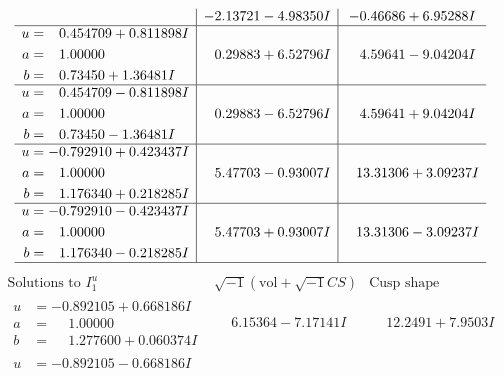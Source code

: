 \documentclass[1p]{elsarticle_modified}
\theoremstyle{definition}
\newcommand{\I}{\sqrt{-1}}
\begin{document}
$$\begin{array}{c|c|c}
 & -2.13721 - 4.98350 I & -0.46686 + 6.95288 I \\ \hline\begin{aligned}
u &= \phantom{-}0.454709 + 0.811898 I \\
a &= \phantom{-}1.00000\phantom{ +0.000000I} \\
b &= \phantom{-}0.73450 + 1.36481 I\end{aligned}
 & \phantom{-}0.29883 + 6.52796 I & \phantom{-}4.59641 - 9.04204 I \\ \hline\begin{aligned}
u &= \phantom{-}0.454709 - 0.811898 I \\
a &= \phantom{-}1.00000\phantom{ +0.000000I} \\
b &= \phantom{-}0.73450 - 1.36481 I\end{aligned}
 & \phantom{-}0.29883 - 6.52796 I & \phantom{-}4.59641 + 9.04204 I \\ \hline\begin{aligned}
u &= -0.792910 + 0.423437 I \\
a &= \phantom{-}1.00000\phantom{ +0.000000I} \\
b &= \phantom{-}1.176340 + 0.218285 I\end{aligned}
 & \phantom{-}5.47703 - 0.93007 I & \phantom{-}13.31306 + 3.09237 I \\ \hline\begin{aligned}
u &= -0.792910 - 0.423437 I \\
a &= \phantom{-}1.00000\phantom{ +0.000000I} \\
b &= \phantom{-}1.176340 - 0.218285 I\end{aligned}
 & \phantom{-}5.47703 + 0.93007 I & \phantom{-}13.31306 - 3.09237 I\\
 \hline 
 \end{array}$$\newpage$$\begin{array}{c|c|c}  
\text{Solutions to }I^u_{1}& \I (\text{vol} + \sqrt{-1}CS) & \text{Cusp shape}\\
 \hline 
\begin{aligned}
u &= -0.892105 + 0.668186 I \\
a &= \phantom{-}1.00000\phantom{ +0.000000I} \\
b &= \phantom{-}1.277600 + 0.060374 I\end{aligned}
 & \phantom{-}6.15364 - 7.17141 I & \phantom{-}12.2491 + 7.9503 I \\ \hline\begin{aligned}
u &= -0.892105 - 0.668186 I \\

\end{aligned}
\end{array}$$
\end{document}
